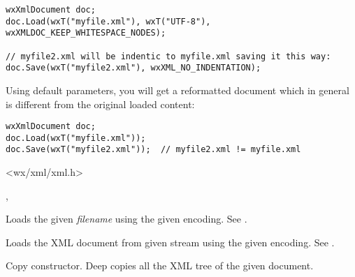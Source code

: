 \begin{verbatim}
wxXmlDocument doc;
doc.Load(wxT("myfile.xml"), wxT("UTF-8"), wxXMLDOC_KEEP_WHITESPACE_NODES);

// myfile2.xml will be indentic to myfile.xml saving it this way:
doc.Save(wxT("myfile2.xml"), wxXML_NO_INDENTATION);
\end{verbatim}

Using default parameters, you will get a reformatted document which in general is different from
the original loaded content:

\begin{verbatim}
wxXmlDocument doc;
doc.Load(wxT("myfile.xml"));
doc.Save(wxT("myfile2.xml"));  // myfile2.xml != myfile.xml
\end{verbatim}





<wx/xml/xml.h>




, 





\label{wxxmldocumentwxxmldocument}




Loads the given {\it filename} using the given encoding. See .


Loads the XML document from given stream using the given encoding. See .


Copy constructor. Deep copies all the XML tree of the given document.


